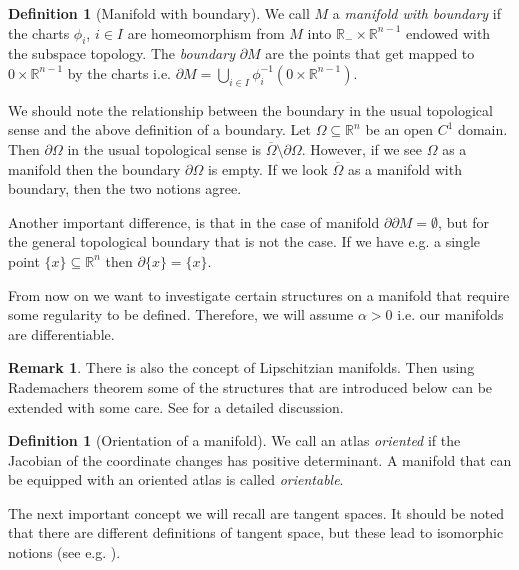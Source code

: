 \documentclass[12pt,a4paper]{article}
\numberwithin{equation}{subsection}
\numberwithin{lemma}{subsection}
\theoremstyle{definition}
\newtheorem{definition}[lemma]{Definition}
\newtheorem{remark}[lemma]{Remark}
\newcommand{\real}{\mathbb{R}}
\begin{document}
\begin{definition}[Manifold with boundary]
    We call $M$ a \textit{manifold with boundary} if the charts $\phi_i$, 
    $i\in I$ are homeomorphism from $M$ into $\real_- \times \real^{n-1}$ 
    endowed with the subspace topology. The \textit{boundary} 
    $\partial M$ are the points that get mapped to ${0} \times \real^{n-1}$ 
    by the charts i.e. $\partial M = \bigcup_{i\in I} \phi_i^{-1}({0} \times \real^{n-1})$.
\end{definition}

We should note the relationship between the boundary in the usual topological sense 
and the above definition of a boundary. Let $\Omega \subseteq \real^n$ be 
an open $C^1$ domain. Then $\partial \Omega$ in the usual topological sense 
is $\overline{\Omega} \setminus \partial \Omega$. However, if we see $\Omega$ 
as a manifold then the boundary $\partial \Omega$ is empty. If we look 
$\overline{\Omega}$ as a manifold with boundary, then the two notions agree.

Another important difference, is that in the case of manifold $\partial \partial M = \emptyset$,
but for the general topological boundary that is not the case. If we have e.g. a single 
point $\{ x \} \subseteq \real^n$ then $\partial \{x \} = \{ x \}$.

From now on we want to investigate certain structures on a manifold 
that require some regularity to be defined. Therefore, 
we will assume $\alpha > 0$ i.e. our manifolds are 
differentiable.

\begin{remark}
    There is also the concept of Lipschitzian manifolds. Then using Rademachers 
    theorem some of the structures that are introduced below can be extended 
    with some care. See \cite{lipschitz_manifolds} for a detailed discussion.
\end{remark}

\begin{definition}[Orientation of a manifold]
    We call an atlas \textit{oriented} if the Jacobian of the coordinate
    changes has positive determinant. A manifold that can be equipped with 
    an oriented atlas is called \textit{orientable}.
\end{definition}

The next important concept we will recall are tangent spaces. 
It should be noted that there are different definitions of tangent space, but
these lead to isomorphic notions 
(see e.g. \cite[Sec.\,1.B]{riemannian_geometry}).
\end{document}
